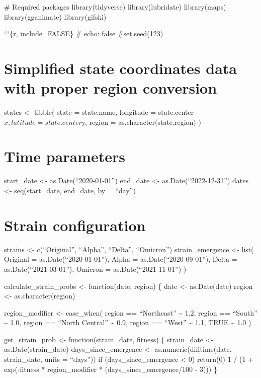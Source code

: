 \documentclass[
]{article}
\newenvironment{Shaded}{\begin{snugshade}}{\end{snugshade}}
\newcommand{\NormalTok}[1]{\textcolor[rgb]{0.00,0.23,0.31}{#1}}
\begin{document}
\begin{Shaded}
\begin{Highlighting}[]
\NormalTok{\# Required packages}
\NormalTok{library(tidyverse)}
\NormalTok{library(lubridate)}
\NormalTok{library(maps)}
\NormalTok{library(gganimate)}
\NormalTok{library(gifski)}
\end{Highlighting}
\end{Shaded}

```\{r, include=FALSE\} \#\textbar{} echo: false \#set.seed(123)

\section{Simplified state coordinates data with proper region
conversion}\label{simplified-state-coordinates-data-with-proper-region-conversion}

states \textless- tibble( state = state.name, longitude =
state.center\(x,
  latitude = state.center\)y, region = as.character(state.region) )

\section{Time parameters}\label{time-parameters}

start\_date \textless- as.Date(``2020-01-01'') end\_date \textless-
as.Date(``2022-12-31'') dates \textless- seq(start\_date, end\_date, by
= ``day'')

\section{Strain configuration}\label{strain-configuration}

strains \textless- c(``Original'', ``Alpha'', ``Delta'', ``Omicron'')
strain\_emergence \textless- list( Original = as.Date(``2020-01-01''),
Alpha = as.Date(``2020-09-01''), Delta = as.Date(``2021-03-01''),
Omicron = as.Date(``2021-11-01'') )

calculate\_strain\_probs \textless- function(date, region) \{ date
\textless- as.Date(date) region \textless- as.character(region)

region\_modifier \textless- case\_when( region == ``Northeast''
\textasciitilde{} 1.2, region == ``South'' \textasciitilde{} 1.0, region
== ``North Central'' \textasciitilde{} 0.9, region == ``West''
\textasciitilde{} 1.1, TRUE \textasciitilde{} 1.0 )

get\_strain\_prob \textless- function(strain\_date, fitness) \{
strain\_date \textless- as.Date(strain\_date) days\_since\_emergence
\textless- as.numeric(difftime(date, strain\_date, units = ``days'')) if
(days\_since\_emergence \textless{} 0) return(0) 1 / (1 + exp(-fitness *
region\_modifier * (days\_since\_emergence/100 - 3))) \}
\end{document}
